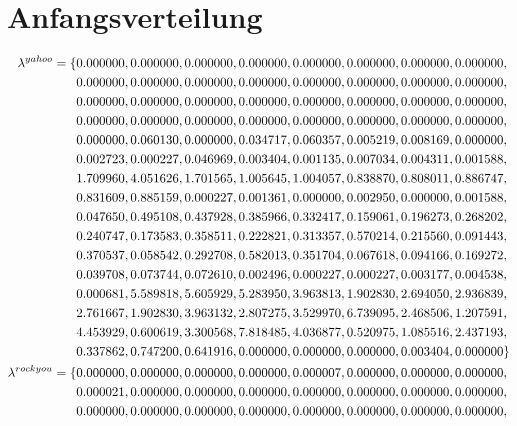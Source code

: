 \documentclass[12pt,a4paper]{scrartcl}
\numberwithin{equation}{section}
\numberwithin{myalgctr}{section}
\numberwithin{mytheoremctr}{section}
\begin{document}
	\section{Anfangsverteilung}\label{anfangsverteilung-appendix}
	\begin{align*}
\lambda^{yahoo}=\{	&0.000000,0.000000,0.000000,0.000000,0.000000,0.000000,0.000000,0.000000,\\
					&0.000000,0.000000,0.000000,0.000000,0.000000,0.000000,0.000000,0.000000,\\
					&0.000000,0.000000,0.000000,0.000000,0.000000,0.000000,0.000000,0.000000,\\
					&0.000000,0.000000,0.000000,0.000000,0.000000,0.000000,0.000000,0.000000,\\
					&0.000000,0.060130,0.000000,0.034717,0.060357,0.005219,0.008169,0.000000,\\
					&0.002723,0.000227,0.046969,0.003404,0.001135,0.007034,0.004311,0.001588,\\
					&1.709960,4.051626,1.701565,1.005645,1.004057,0.838870,0.808011,0.886747,\\
					&0.831609,0.885159,0.000227,0.001361,0.000000,0.002950,0.000000,0.001588,\\
					&0.047650,0.495108,0.437928,0.385966,0.332417,0.159061,0.196273,0.268202,\\
					&0.240747,0.173583,0.358511,0.222821,0.313357,0.570214,0.215560,0.091443,\\
					&0.370537,0.058542,0.292708,0.582013,0.351704,0.067618,0.094166,0.169272,\\
					&0.039708,0.073744,0.072610,0.002496,0.000227,0.000227,0.003177,0.004538,\\
					&0.000681,5.589818,5.605929,5.283950,3.963813,1.902830,2.694050,2.936839,\\
					&2.761667,1.902830,3.963132,2.807275,3.529970,6.739095,2.468506,1.207591,\\
					&4.453929,0.600619,3.300568,7.818485,4.036877,0.520975,1.085516,2.437193,\\
					&0.337862,0.747200,0.641916,0.000000,0.000000,0.000000,0.003404,0.000000\}\\
		\vspace*{.1cm}
\lambda^{rockyou}=\{&0.000000,0.000000,0.000000,0.000000,0.000007,0.000000,0.000000,0.000000,\\
					&0.000021,0.000000,0.000000,0.000000,0.000000,0.000000,0.000000,0.000000,\\
					&0.000000,0.000000,0.000000,0.000000,0.000000,0.000000,0.000000,0.000000,\\

\end{align*}
\end{document}
